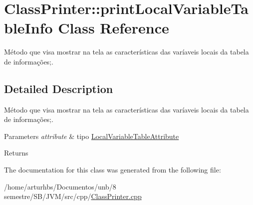 \hypertarget{classClassPrinter_1_1printLocalVariableTableInfo}{}\section{Class\+Printer\+:\+:print\+Local\+Variable\+Table\+Info Class Reference}
\label{classClassPrinter_1_1printLocalVariableTableInfo}


Método que visa mostrar na tela as características das varíaveis locais da tabela de informações;.  




\subsection{Detailed Description}
Método que visa mostrar na tela as características das varíaveis locais da tabela de informações;. 


\begin{DoxyParams}{Parameters}
{\em attribute} & tipo \hyperlink{classLocalVariableTableAttribute}{Local\+Variable\+Table\+Attribute} \\
\hline
\end{DoxyParams}
\begin{DoxyReturn}{Returns}

\end{DoxyReturn}


The documentation for this class was generated from the following file\+:\begin{DoxyCompactItemize}
\item 
/home/arturhbs/\+Documentos/unb/8 semestre/\+S\+B/\+J\+V\+M/src/cpp/\hyperlink{ClassPrinter_8cpp}{Class\+Printer.\+cpp}\end{DoxyCompactItemize}
